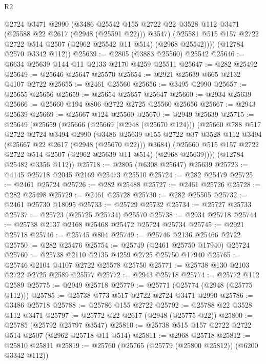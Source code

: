 \begin{lexlean}{R2}
\begin{coremodule}
          @2724
          @3471
          @2990
          (@3486
            @25542
            @155
            @2722
            @22
            @3528
            @112
            @3471
            (@25588 @22 @2617 (@2948 (@25591 @22)))
            @3547)
          (@25581 @515 @157 @2722 @2722 @514 @2507 (@2962 @25542 @11 @514) (@2968 @25542))))
      (@12784 @2570 @3342 @112))
@25639 := @2805 (@3883 @25560) @25542
@25646 := @6634 @25639 @144 @11 @2133 @2170 @4259 @25511
@25647 := @282 @25492
@25649 := @25646 @25647 @25570
@25654 := @2921 @25639 @665 @2132 @4107 @2722
@25655 := @2461 @25560
@25656 := @3495 @2990
@25657 := @25655 @25656
@25659 := @25654 @25657 @25647
@25660 := @2934 @25639
@25666 := @25660 @194 @806 @2722 @2725 @25560 @25656
@25667 := @2943 @25639
@25669 := @25667 @124 @25560
@25670 := @2949 @25639
@25715 := @25649
    (@25659
      (@25666
        (@25669 (@2948 (@25670 @124)))
        (@25660
          @788
          @517
          @2722
          @2724
          @3494
          @2990
          (@3486
            @25639
            @155
            @2722
            @37
            @3528
            @112
            @3494
            (@25667 @22 @2617 (@2948 (@25670 @22)))
            @3684)
          (@25660 @515 @157 @2722 @2722 @514 @2507 (@2962 @25639 @11 @514) (@2968 @25639))))
      (@12784 @25482 @3356 @112))
@25718 := @2805 (@6308 @25647) @25639
@25723 := @4145 @25718 @2045 @2169 @25473 @25510
@25724 := @282 @25479
@25725 := @2461 @25724
@25726 := @282 @25488
@25727 := @2461 @25726
@25728 := @282 @25498
@25729 := @2461 @25728
@25730 := @282 @25505
@25732 := @2461 @25730 @18095
@25733 := @25729 @25732
@25734 := @25727 @25733
@25737 := @25723 (@25725 @25734) @25570
@25738 := @2934 @25718
@25744 := @25738 @2137 @2168 @25468 @25472 @25724 @25734
@25745 := @2921 @25718
@25746 := @25745 @804
@25749 := @25746 @2136 @25466 @2722
@25750 := @282 @25476
@25754 := @25749 (@2461 @25750 @17940) @25724
@25760 := @25738 @2110 @2135 @4259 @2725 @25750 @17940
@25765 := @25746 @2104 @4107 @2722 @25578 @25750
@25771 := @25738 @130 @2103 @2722 @2725 @2589 @25577
@25772 := @2943 @25718
@25774 := @25772 @112 @2589
@25775 := @2949 @25718
@25779 := @25771 (@25774 (@2948 (@25775 @112)))
@25785 := @25738 @773 @517 @2722 @2724 @3471 @2990
@25786 := @3486 @25718
@25788 := @25786 @155 @2722
@25792 := @25788 @22 @3528 @112 @3471
@25797 := @25772 @22 @2617 (@2948 (@25775 @22))
@25800 := @25785 (@25792 @25797 @3547)
@25810 := @25738 @515 @157 @2722 @2722 @514 @2507 (@2962 @25718 @11 @514)
@25811 := @2968 @25718
@25812 := @25810 @25811
@25819 := @25760 (@25765 (@25779 (@25800 @25812)) (@6200 @3342 @112))

\end{coremodule}
\end{lexlean}
